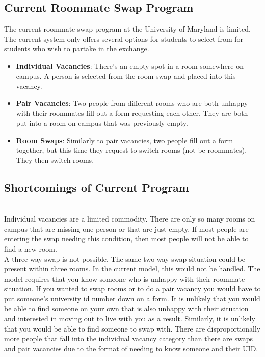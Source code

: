 \documentclass[12pt]{article}
\begin{document}
\subsection{Current Roommate Swap Program}
The current roommate swap program at the University of Maryland is limited. The current system only offers several options for students to select from for students who wish to partake in the exchange. 


\begin{itemize}[noitemsep]
\item \textbf{Individual Vacancies}: There's an empty spot in a room somewhere on campus. A person is selected from the room swap and placed into this vacancy.\\
\item \textbf{Pair Vacancies}: Two people from different rooms who are both unhappy with their roommates fill out a form requesting each other. They are both put into a room on campus that was previously empty.\\
\item \textbf{Room Swaps}: Similarly to pair vacancies, two people fill out a form together, but this time they request to switch rooms (not be roommates). They then switch rooms.
\end{itemize}

\subsection{Shortcomings of Current Program}
\\
Individual vacancies are a limited commodity. There are only so many rooms on campus that are missing one person or that are just empty. If most people are entering the swap needing this condition, then most people will not be able to find a new room. \\

A three-way swap is not possible. The same two-way swap situation could be present within three rooms. In the current model, this would not be handled.
The model requires that you know someone who is unhappy with their roommate situation. If you wanted to swap rooms or to do a pair vacancy you would have to put someone’s university id number down on a form. It is unlikely that you would be able to find someone on your own that is also unhappy with their situation and interested in moving out to live with you as a result. Similarly, it is unlikely that you would be able to find someone to swap with. There are disproportionally more people that fall into the individual vacancy category than there are swaps and pair vacancies due to the format of needing to know someone and their UID. \\
\end{document}
